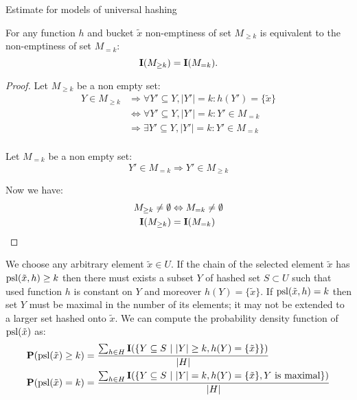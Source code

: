 \begin{section}{Estimate for models of universal hashing}
\begin{lemma}
\label{lemma-indicator-k-collision}
For any function $h$ and bucket $\tilde{x}$ non-emptiness of set $M_{\geq k}$ is equivalent to the non-emptiness of set $M_{= k}$:
\begin{displaymath}
\mathbf{I}(M_{\geq k}) = \mathbf{I}(M_{= k}) \text{.}
\end{displaymath}
\begin{proof}
Let $M_{\geq k}$ be a non empty set:
\begin{displaymath}
\begin{split}
Y \in M_{\geq k} 
	& \Rightarrow \forall Y' \subseteq Y, |Y'| = k: h(Y') = \{\tilde{x}\} \\
	& \Leftrightarrow \forall Y' \subseteq Y, |Y'| = k: Y' \in M_{=k} \\
	& \Rightarrow \exists Y' \subseteq Y, |Y'| = k: Y' \in M_{=k} \\
\end{split}
\end{displaymath}

Let $M_{=k}$ be a non empty set:
\begin{displaymath}
Y' \in M_{=k} \Rightarrow Y' \in M_{\geq k}
\end{displaymath}

Now we have:
\begin{displaymath}
\begin{split}
M_{\geq k} \neq \emptyset & \Leftrightarrow  M_{= k} \neq \emptyset \\
\mathbf{I}(M_{\geq k}) & = \mathbf{I}(M_{= k})
\end{split}
\end{displaymath}
\end{proof}
\end{lemma}

We choose any arbitrary element $\tilde{x} \in U$. If the chain of the selected element $\tilde{x}$ has $\mathrm{psl}(\tilde{x}, h) \geq k$ then there must exists a subset $Y$ of hashed set $S \subset U$ such that used function $h$ is constant on $Y$ and moreover $h(Y) = \{ \tilde{x} \}$. If $\mathrm{psl}(\tilde{x}, h) = k$ then set $Y$ must be maximal in the number of its elements; it may not be extended to a larger set hashed onto $\tilde{x}$. We can compute the probability density function of $\mathrm{psl}(\tilde{x})$ as:
\begin{displaymath}
\begin{split}
\mathbf{P}(\mathrm{psl}(\tilde{x}) \geq k) & = \frac{\sum\displaylimits_{h \in H} \mathbf{I}(\{ Y \subseteq S \ | \  |Y| \geq k, h(Y) = \{ \tilde{x} \} \})}{|H|} \\
\mathbf{P}(\mathrm{psl}(\tilde{x}) = k) & = \frac{\sum\displaylimits_{h \in H} \mathbf{I}(\{ Y \subseteq S \ | \  |Y| = k, h(Y) = \{ \tilde{x} \}, Y \text{ is maximal} \})}{|H|} \\
\end{split}
\end{displaymath}


\end{section}
